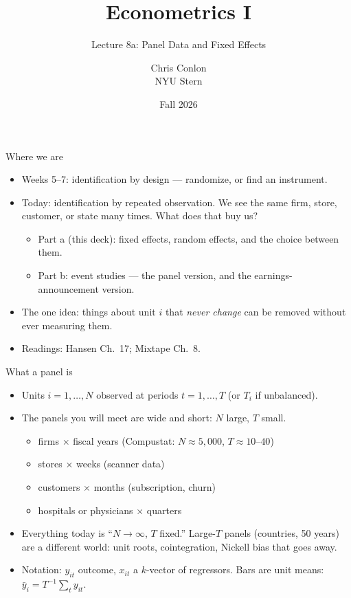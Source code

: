 \documentclass[aspectratio=169,11pt]{beamer}
\title[L8a - Panel Data]{ Econometrics I}
\subtitle{Lecture 8a: Panel Data and Fixed Effects}
\author{Chris Conlon \\NYU Stern}
\date{Fall 2026}
\begin{document}
\maketitle

\begin{frame}{Where we are}
\begin{itemize}
	\item Weeks 5--7: identification by \alert{design} --- randomize, or find an instrument.

	\medskip
	\item Today: identification by \alert{repeated observation}. We see the same firm, store,
	customer, or state many times. What does that buy us?
	\begin{itemize}
		\item Part a (this deck): fixed effects, random effects, and the choice between them.
		\item Part b: event studies --- the panel version, and the earnings-announcement version.
	\end{itemize}

	\medskip
	\item The one idea: things about unit $i$ that \emph{never change} can be removed
	without ever measuring them.

	\medskip
	\item Readings: Hansen Ch.~17; Mixtape Ch.~8.
\end{itemize}
\end{frame}


\begin{frame}{What a panel is}
\begin{itemize}
	\item Units $i = 1,\dots,N$ observed at periods $t = 1,\dots,T$ (or $T_i$ if unbalanced).
	\medskip
	\item The panels you will meet are \alert{wide and short}: $N$ large, $T$ small.
	\begin{itemize}
		\item firms $\times$ fiscal years (Compustat: $N \approx 5{,}000$, $T \approx 10$--$40$)
		\item stores $\times$ weeks (scanner data)
		\item customers $\times$ months (subscription, churn)
		\item hospitals or physicians $\times$ quarters
	\end{itemize}
	\medskip
	\item Everything today is ``$N \to \infty$, $T$ fixed.'' Large-$T$ panels (countries, 50 years)
	are a different world: unit roots, cointegration, Nickell bias that goes away.
	\medskip
	\item Notation: $y_{it}$ outcome, $x_{it}$ a $k$-vector of regressors. Bars are unit means:
	$\bar y_i = T^{-1}\sum_t y_{it}$.
\end{itemize}
\end{frame}
\end{document}
